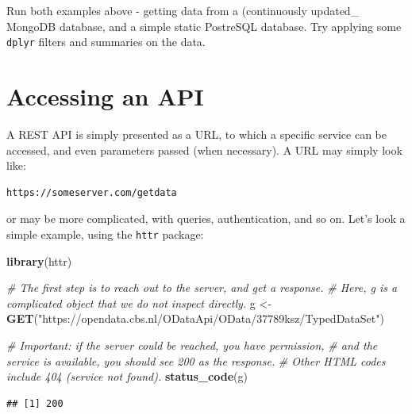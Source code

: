 \documentclass[]{book}
\newenvironment{Shaded}{\begin{snugshade}}{\end{snugshade}}
\newcommand{\CommentTok}[1]{\textcolor[rgb]{0.56,0.35,0.01}{\textit{#1}}}
\newcommand{\KeywordTok}[1]{\textcolor[rgb]{0.13,0.29,0.53}{\textbf{#1}}}
\newcommand{\NormalTok}[1]{#1}
\newcommand{\OperatorTok}[1]{\textcolor[rgb]{0.81,0.36,0.00}{\textbf{#1}}}
\newcommand{\StringTok}[1]{\textcolor[rgb]{0.31,0.60,0.02}{#1}}
\let\BeginKnitrBlock\begin \let\EndKnitrBlock\end
\begin{document}
\BeginKnitrBlock{rmdtry}
Run both examples above - getting data from a (continuously updated\_ MongoDB database, and a simple static PostreSQL database. Try applying some \texttt{dplyr} filters and summaries on the data.
\EndKnitrBlock{rmdtry}

\hypertarget{accessing-an-api}{%
\section{Accessing an API}\label{accessing-an-api}}

A REST API is simply presented as a URL, to which a specific service can be accessed, and even parameters passed (when necessary). A URL may simply look like:

\begin{verbatim}
https://someserver.com/getdata
\end{verbatim}

or may be more complicated, with queries, authentication, and so on. Let's look a simple example, using the \texttt{httr} package:

\begin{Shaded}
\begin{Highlighting}[]
\KeywordTok{library}\NormalTok{(httr)}

\CommentTok{# The first step is to reach out to the server, and get a response.}
\CommentTok{# Here, g is a complicated object that we do not inspect directly.}
\NormalTok{g <-}\StringTok{ }\KeywordTok{GET}\NormalTok{(}\StringTok{"https://opendata.cbs.nl/ODataApi/OData/37789ksz/TypedDataSet"}\NormalTok{)}

\CommentTok{# Important: if the server could be reached, you have permission, }
\CommentTok{# and the service is available, you should see 200 as the response.}
\CommentTok{# Other HTML codes include 404 (service not found).}
\KeywordTok{status_code}\NormalTok{(g)}
\end{Highlighting}
\end{Shaded}

\begin{verbatim}
## [1] 200
\end{verbatim}

\begin{Shaded}
\end{Shaded}
\end{document}

